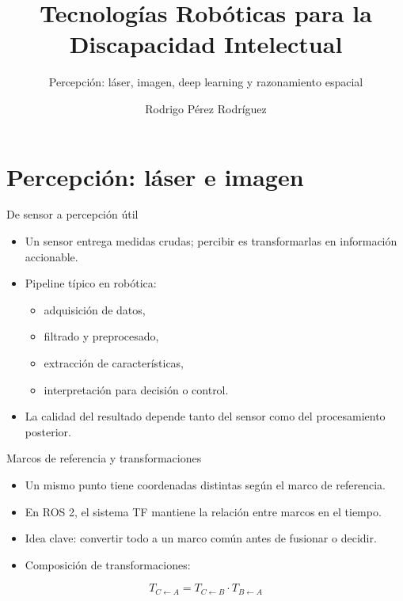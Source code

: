 \documentclass[aspectratio=169]{beamer}
\author{Rodrigo Pérez Rodríguez}
\title{Tecnologías Robóticas para la Discapacidad Intelectual}
\subtitle{Percepción: láser, imagen, deep learning y razonamiento espacial}
\date{}
\begin{document}
\begin{frame}
    \titlepage
\end{frame}

\begin{frame}
    \tableofcontents[sectionstyle=show,subsectionstyle=show/shaded/hide,subsubsectionstyle=show/shaded/hide]
\end{frame}

\section{Percepción: láser e imagen}

\begin{frame}{De sensor a percepción útil}
  \small
  \begin{itemize}
    \item Un sensor entrega medidas crudas; percibir es transformarlas en información accionable.
    \item Pipeline típico en robótica:
    \begin{itemize}
      \item adquisición de datos,
      \item filtrado y preprocesado,
      \item extracción de características,
      \item interpretación para decisión o control.
    \end{itemize}
    \item La calidad del resultado depende tanto del sensor como del procesamiento posterior.
  \end{itemize}
\end{frame}

\begin{frame}{Marcos de referencia y transformaciones}
  \small
  \begin{itemize}
    \item Un mismo punto tiene coordenadas distintas según el marco de referencia.
    \item En ROS 2, el sistema TF mantiene la relación entre marcos en el tiempo.
    \item Idea clave: convertir todo a un marco común antes de fusionar o decidir.
    \item Composición de transformaciones:
  \end{itemize}
  \[
    T_{C \leftarrow A}=T_{C \leftarrow B} \cdot T_{B \leftarrow A}
  \]
\end{frame}
\end{document}
